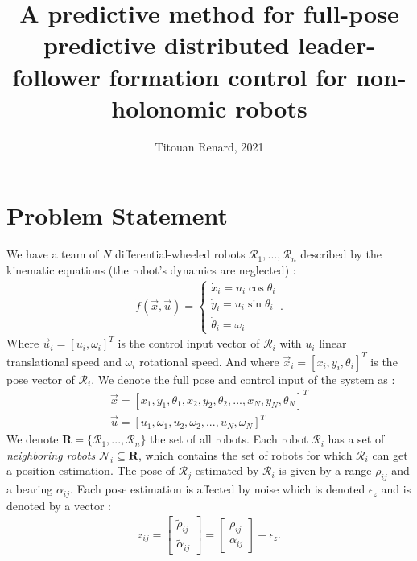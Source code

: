 \documentclass{article}
\title{A predictive method for full-pose predictive distributed leader-follower formation control for non-holonomic robots}
\author{Titouan Renard, 2021}
\newcommand{\1}{\bm{1}} %
\begin{document}
\maketitle

\section{Problem Statement}

We have a team of $N$ differential-wheeled robots $\mathcal{R}_1, ..., \mathcal{R}_n$ described by the kinematic equations (the robot's dynamics are neglected) :
\begin{align}
    \dot{f}(\vec{x},\vec{u}) = 
    \begin{cases}
        \dot{x}_i = u_i \cos \theta_i \\
        \dot{y}_i = u_i \sin \theta_i \\
        \dot{\theta}_i = \omega_i
    \end{cases}.
\end{align}
Where $\vec{u}_i = [u_i,\omega_i]^T$ is the control input vector of $\mathcal{R}_i$ with $u_i$ linear translational speed and $\omega_i$ rotational speed. And where $\vec{x}_i = [x_i,y_i,\theta_i]^T$ is the pose vector of $\mathcal{R}_i$. We denote the full pose and control input of the system as :
\begin{align}
    \vec{x} = [x_1,y_1,\theta_1,x_2,y_2,\theta_2,...,x_N,y_N,\theta_N]^T \\
    \vec{u} = [u_1,\omega_1,u_2,\omega_2,...,u_N,\omega_N]^T
\end{align}
We denote $\textbf{R} = \{\mathcal{R}_1, ..., \mathcal{R}_n\}$ the set of all robots. Each robot $\mathcal{R}_i$ has a set of \textit{neighboring robots} $\mathcal{N}_i \subseteq \textbf{R}$, which contains the set of robots for which $\mathcal{R}_i$ can get a position estimation. The pose of $\mathcal{R}_j$ estimated by $\mathcal{R}_i$ is given by a range $\rho_{ij}$ and a bearing $\alpha_{ij}$. Each pose estimation is affected by noise which is denoted $\epsilon_z$ and is denoted by a vector  :
\begin{align}
    z_{ij} = \begin{bmatrix}
        \tilde{\rho}_{ij} \\
        \tilde{\alpha}_{ij} 
    \end{bmatrix}
    = \begin{bmatrix}
        {\rho}_{ij} \\
        {\alpha}_{ij} 
    \end{bmatrix} + \epsilon_z.
\end{align}
\end{document}
